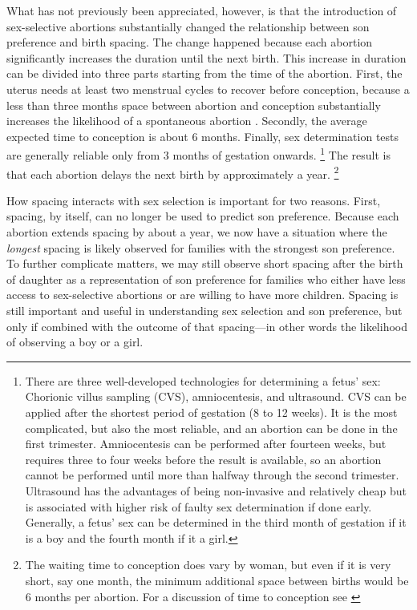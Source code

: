 \documentclass[12pt,letterpaper]{article}
\begin{document}
What has not previously been appreciated, however, is that the introduction 
of sex-selective abortions substantially changed the relationship between 
son preference and birth spacing.
The change happened because each abortion significantly increases the duration 
until the next birth.
This increase in duration can be divided into three parts starting from the time of
the abortion.
First, the uterus needs at least two menstrual cycles to recover 
before conception, because a less than three months space 
between abortion and conception substantially increases the likelihood 
of a spontaneous abortion \citep{zhou00b}.
Secondly, the average expected time to conception is about 6 months.
Finally, sex determination tests are generally reliable only from 3 months 
of gestation onwards.%
\footnote{
There are three well-developed technologies for determining a fetus' sex: 
Chorionic villus sampling (CVS), amniocentesis, and ultrasound.
CVS can be applied after the shortest period
of gestation (8 to 12 weeks).
It is the most complicated, but also the most reliable, and an abortion can be done in 
the first trimester.
Amniocentesis can be performed after fourteen weeks, but requires three to four weeks
before the result is available, so an abortion cannot be performed until more than 
halfway through the second trimester.
Ultrasound has the advantages of being non-invasive and relatively cheap but 
is associated with higher risk of faulty sex determination if done early.
Generally, a fetus' sex can be determined in the third month of gestation if it is a
boy and the fourth month if it a girl.
}
The result is that each abortion delays the next birth by approximately 
a year.%
\footnote{
The waiting time to conception does vary by woman, but
even if it is very short, say one  month, the minimum additional space between
births would be 6 months per abortion.
For a discussion of time to conception see \citep{Wang2003}
}


How spacing interacts with sex selection is important for two reasons.
First, spacing, by itself, can no longer be used to predict son preference. 
Because each abortion extends spacing by about a year, we now have a situation 
where the \emph{longest} spacing is likely observed for families with the 
strongest son preference.
To further complicate matters, 
we may still observe short spacing after the birth of daughter as a representation 
of son preference for families who either have less access to sex-selective 
abortions or are willing to have more children.
Spacing is still important and useful in understanding sex selection and son
preference, but only if combined with the outcome of that spacing---in other words 
the likelihood of observing a boy or a girl.
\end{document}
